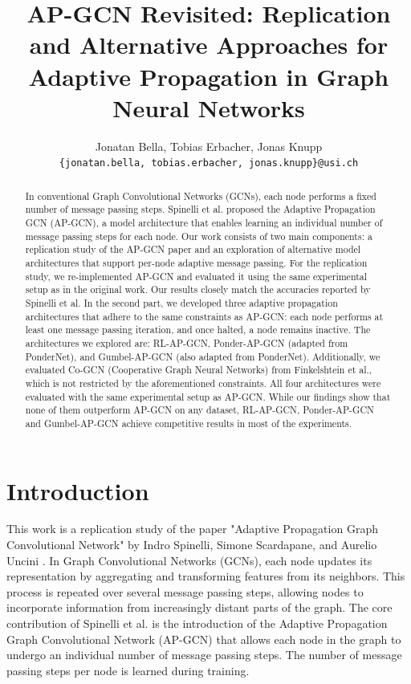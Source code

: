 \documentclass{gdl}
\begin{document}
\title{AP-GCN Revisited: Replication and Alternative Approaches for Adaptive Propagation in Graph Neural Networks}

\author{%
Jonatan Bella, Tobias Erbacher, Jonas Knupp\\
\texttt{\{jonatan.bella, tobias.erbacher, jonas.knupp\}@usi.ch}
\vspace{-1.0cm}
}

\begin{abstract}
In conventional Graph Convolutional Networks (GCNs), each node performs a fixed number of message passing steps. Spinelli et al. proposed the Adaptive Propagation GCN (AP-GCN), a model architecture that enables learning an individual number of message passing steps for each node. Our work consists of two main components: a replication study of the AP-GCN paper and an exploration of alternative model architectures that support per-node adaptive message passing.
For the replication study, we re-implemented AP-GCN and evaluated it using the same experimental setup as in the original work. Our results closely match the accuracies reported by Spinelli et al.
In the second part, we developed three adaptive propagation architectures that adhere to the same constraints as AP-GCN: each node performs at least one message passing iteration, and once halted, a node remains inactive. The architectures we explored are: RL-AP-GCN, Ponder-AP-GCN (adapted from PonderNet), and Gumbel-AP-GCN (also adapted from PonderNet). Additionally, we evaluated Co-GCN (Cooperative Graph Neural Networks) from Finkelshtein et al., which is not restricted by the aforementioned constraints.
All four architectures were evaluated with the same experimental setup as AP-GCN. While our findings show that none of them outperform AP-GCN on any dataset, RL-AP-GCN, Ponder-AP-GCN and Gumbel-AP-GCN achieve competitive results in most of the experiments. 
\vspace{-1.5cm}
\end{abstract}


\maketitle

\section{Introduction}
This work is a replication study of the paper "Adaptive Propagation Graph Convolutional Network" by Indro Spinelli, Simone Scardapane, and Aurelio Uncini \cite{spinelli2021}. In Graph Convolutional Networks (GCNs), each node updates its representation by aggregating and transforming features from its neighbors. This process is repeated over several message passing steps, allowing nodes to incorporate information from increasingly distant parts of the graph. The core contribution of Spinelli et al. is the introduction of the Adaptive Propagation Graph Convolutional Network (AP-GCN) that allows each node in the graph to undergo an individual number of message passing steps. The number of message passing steps per node is learned during training.
\end{document}
